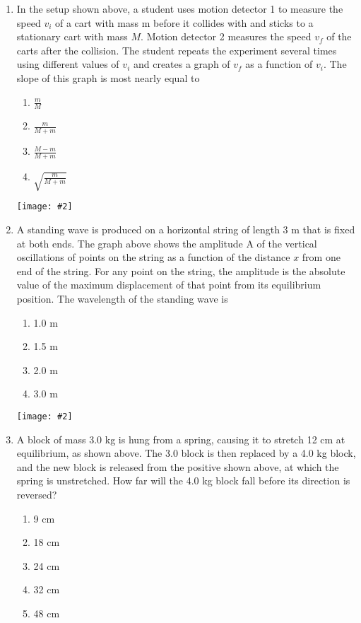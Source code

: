 \documentclass[11pt]{article}
\newcommand{\pic}[2]{\texttt{[image: \#2]}}
\begin{document}
\begin{multicols}{2}
\begin{enumerate}[leftmargin=18pt,resume]
    \begin{center}
      \pic{.48}{car-collision}
    \end{center}
  \item In the setup shown above, a student uses motion detector 1 to measure
    the speed $v_i$ of a cart with mass m before it collides with and sticks to
    a stationary cart with mass $M$. Motion detector 2 measures the speed $v_f$
    of the carts after the collision. The student repeats the experiment
    several times using different values of $v_i$ and creates a graph of $v_f$
    as a function of $v_i$. The slope of this graph is most nearly equal to
    \begin{enumerate}[nosep,leftmargin=18pt,label=(\Alph*)]
    \item$\displaystyle\frac{m}{M}$
    \item$\displaystyle\frac{m}{M+m}$
    \item$\displaystyle\frac{M-m}{M+m}$
    \item$\displaystyle\sqrt{\frac{m}{M+m}}$
    \end{enumerate}
    
    \begin{center}
      \pic{.45}{standing-wave}
    \end{center}
  \item A standing wave is produced on a horizontal string of length 3 m that
    is fixed at both ends. The graph above shows the amplitude A of the
    vertical oscillations of points on the string as a function of the distance
    $x$ from one end of the string. For any point on the string, the amplitude
    is the absolute value of the maximum displacement of that point from its
    equilibrium position. The wavelength of the standing wave is
    \begin{enumerate}[nosep,leftmargin=18pt,label=(\Alph*)]
    \item 1.0 m
    \item 1.5 m
    \item 2.0 m
    \item 3.0 m
    \end{enumerate}
    \columnbreak
    
    \begin{center}
      \pic{.25}{two-masses}
    \end{center}
  \item A block of mass 3.0 kg is hung from a spring, causing it to stretch 12
    cm at equilibrium, as shown above. The 3.0 block is then replaced by a 4.0
    kg block, and the new block is released from the positive shown above, at
    which the spring is unstretched. How far will the 4.0 kg block fall before
    its direction is reversed?
    \begin{enumerate}[nosep,leftmargin=18pt,label=(\Alph*)]
    \item 9 cm
    \item 18 cm
    \item 24 cm
    \item 32 cm
    \item 48 cm
    \end{enumerate}
    

\end{enumerate}
\end{multicols}
\end{document}
